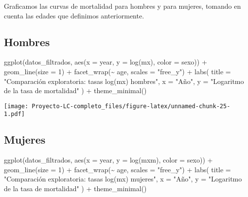 \documentclass[
]{article}
\newenvironment{Shaded}{\begin{snugshade}}{\end{snugshade}}
\newcommand{\AttributeTok}[1]{\textcolor[rgb]{0.77,0.63,0.00}{#1}}
\newcommand{\DecValTok}[1]{\textcolor[rgb]{0.00,0.00,0.81}{#1}}
\newcommand{\FunctionTok}[1]{\textcolor[rgb]{0.00,0.00,0.00}{#1}}
\newcommand{\NormalTok}[1]{#1}
\newcommand{\SpecialCharTok}[1]{\textcolor[rgb]{0.00,0.00,0.00}{#1}}
\newcommand{\StringTok}[1]{\textcolor[rgb]{0.31,0.60,0.02}{#1}}
\begin{document}
Graficamos las curvas de mortalidad para hombres y para mujeres, tomando
en cuenta las edades que definimos anteriormente.

\hypertarget{hombres-1}{%
\subsection{Hombres}\label{hombres-1}}

\begin{Shaded}
\begin{Highlighting}[]
\FunctionTok{ggplot}\NormalTok{(datos\_filtrados, }\FunctionTok{aes}\NormalTok{(}\AttributeTok{x =}\NormalTok{ year, }\AttributeTok{y =} \FunctionTok{log}\NormalTok{(mx), }\AttributeTok{color =}\NormalTok{ sexo)) }\SpecialCharTok{+}
  \FunctionTok{geom\_line}\NormalTok{(}\AttributeTok{size =} \DecValTok{1}\NormalTok{) }\SpecialCharTok{+}
  \FunctionTok{facet\_wrap}\NormalTok{(}\SpecialCharTok{\textasciitilde{}}\NormalTok{ age, }\AttributeTok{scales =} \StringTok{"free\_y"}\NormalTok{) }\SpecialCharTok{+}
  \FunctionTok{labs}\NormalTok{(}
    \AttributeTok{title =} \StringTok{"Comparación exploratoria: tasas log(mx) hombres"}\NormalTok{,}
    \AttributeTok{x =} \StringTok{"Año"}\NormalTok{, }\AttributeTok{y =} \StringTok{"Logaritmo de la tasa de mortalidad"}
\NormalTok{  ) }\SpecialCharTok{+}
  \FunctionTok{theme\_minimal}\NormalTok{()}
\end{Highlighting}
\end{Shaded}

\texttt{[image: Proyecto-LC-completo\_files/figure-latex/unnamed-chunk-25-1.pdf]}

\hypertarget{mujeres-1}{%
\subsection{Mujeres}\label{mujeres-1}}

\begin{Shaded}
\begin{Highlighting}[]
\FunctionTok{ggplot}\NormalTok{(datos\_filtrados, }\FunctionTok{aes}\NormalTok{(}\AttributeTok{x =}\NormalTok{ year, }\AttributeTok{y =} \FunctionTok{log}\NormalTok{(mxm), }\AttributeTok{color =}\NormalTok{ sexo)) }\SpecialCharTok{+}
  \FunctionTok{geom\_line}\NormalTok{(}\AttributeTok{size =} \DecValTok{1}\NormalTok{) }\SpecialCharTok{+}
  \FunctionTok{facet\_wrap}\NormalTok{(}\SpecialCharTok{\textasciitilde{}}\NormalTok{ age, }\AttributeTok{scales =} \StringTok{"free\_y"}\NormalTok{) }\SpecialCharTok{+}
  \FunctionTok{labs}\NormalTok{(}
    \AttributeTok{title =} \StringTok{"Comparación exploratoria: tasas log(mx) mujeres"}\NormalTok{,}
    \AttributeTok{x =} \StringTok{"Año"}\NormalTok{, }\AttributeTok{y =} \StringTok{"Logaritmo de la tasa de mortalidad"}
\NormalTok{  ) }\SpecialCharTok{+}
  \FunctionTok{theme\_minimal}\NormalTok{()}
\end{Highlighting}
\end{Shaded}
\end{document}
